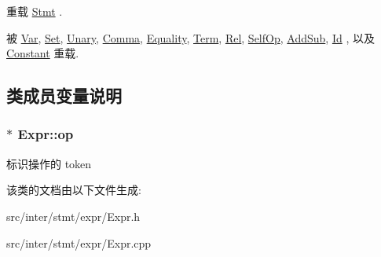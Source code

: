 重载 \hyperlink{class_stmt_abdc3261770c3c5bd3ce5b3ba6eedfaa4}{Stmt} .



被 \hyperlink{class_var_a9dc96e803f7b0f9aa519c2c0e0a6bd8f}{Var}, \hyperlink{class_set_a7776ba36f3af8b09772b36927beb5f5c}{Set}, \hyperlink{class_unary_af42edff1ee4718a9afeb7127e41af758}{Unary}, \hyperlink{class_comma_aab9ca2bb70a10abd2fb263de745f843a}{Comma}, \hyperlink{class_equality_a0255c33af70613b006b03a329ed329ff}{Equality}, \hyperlink{class_term_ac2d20115da73f9425e5d390856a211a1}{Term}, \hyperlink{class_rel_a82b2f3b75a2b9e81631f2659d42a36d1}{Rel}, \hyperlink{class_self_op_ab452bcad1cd4f1286813b1f737583818}{Self\+Op}, \hyperlink{class_add_sub_a73c0513a31a5400fdfc79ce877a1c3b9}{Add\+Sub}, \hyperlink{class_id_ae43a9ffecbbc0ac4fd041b8e8e3c3de0}{Id} , 以及 \hyperlink{class_constant_ab5c55607bcff5ce70131a588b6bdbed7}{Constant} 重载.



\subsection{类成员变量说明}
\subsubsection[{\texorpdfstring{op}{op}}]{$\ast$ Expr\+::op}\hypertarget{class_expr_a5fd7721b7843686e3ec7e63fddf95644}{}\label{class_expr_a5fd7721b7843686e3ec7e63fddf95644}
标识操作的 token 

该类的文档由以下文件生成\+:\begin{DoxyCompactItemize}
\item 
src/inter/stmt/expr/Expr.\+h\item 
src/inter/stmt/expr/Expr.\+cpp\end{DoxyCompactItemize}
